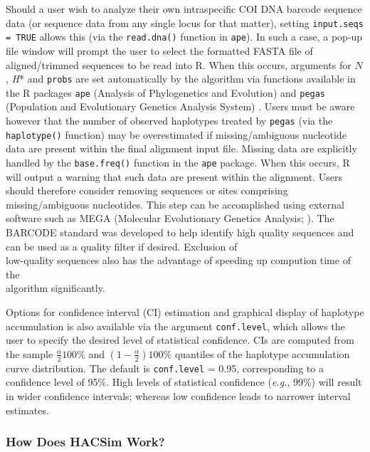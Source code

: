 Should a user wish to analyze their own intraspecific COI DNA barcode sequence data (or sequence data from any single locus for that matter), setting {\tt input.seqs = TRUE} allows this (via the {\tt read.dna()} function in {\tt ape}). In such a case, a pop-up file window will prompt the user to select the formatted FASTA file of aligned/trimmed sequences to be read into R. When this occurs, arguments for $N$, \textit{H}* and {\tt probs} are set automatically by the algorithm via functions available in the R packages {\tt ape} (Analysis of Phylogenetics and Evolution) \cite{paradis2004ape} and {\tt pegas} (Population and Evolutionary Genetics Analysis System) \cite{paradis2010pegas}. Users must be aware however that the number of observed haplotypes treated by {\tt pegas} (via the {\tt haplotype()} function) may be overestimated if missing/ambiguous nucleotide data are present within the final alignment input file. Missing data are explicitly handled by the {\tt base.freq()} function in the {\tt ape} package. When this occurs, R will output a warning that such data are present within the alignment. Users should therefore consider removing sequences or sites comprising missing/ambiguous nucleotides. This step can be accomplished using external software such as MEGA (Molecular Evolutionary Genetics Analysis; \cite{kumar2016mega7}). The BARCODE standard \cite{hanner2009data} was developed to help identify high quality sequences and can be used as a quality filter if desired. Exclusion of \\ low-quality sequences also has the advantage of speeding up compution time of the \\ algorithm significantly.

Options for confidence interval (CI) estimation and graphical display of haplotype \\ accumulation is also available via the argument {\tt conf.level}, which allows the user to specify the desired level of statistical confidence. CIs are computed from the sample $\frac{\alpha}{2}100\%$ and $(1-\frac{\alpha}{2})100\%$ quantiles of the haplotype accumulation curve distribution. The default is {\tt conf.level} = 0.95, corresponding to a confidence level of 95\%. High levels of statistical confidence (\textit{e.g.}, 99\%) will result in wider confidence intervals; whereas low confidence leads to narrower interval estimates.

\subsubsection{How Does HACSim Work?}

